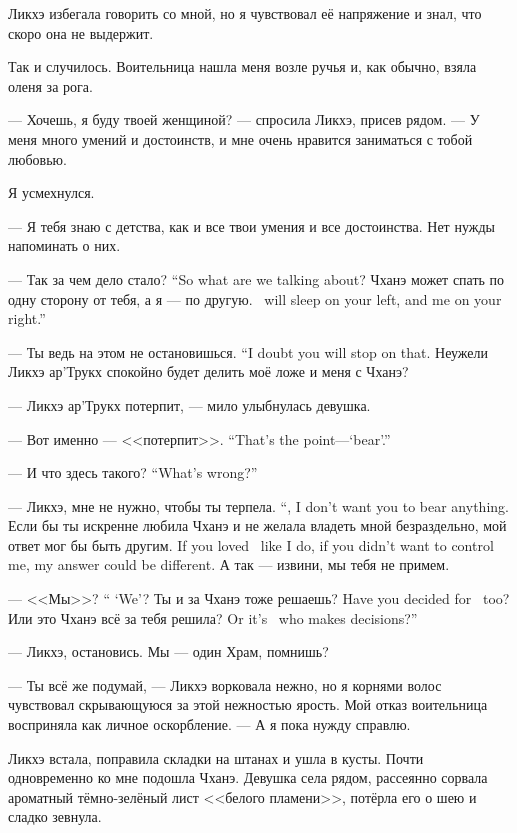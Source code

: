 Ликхэ избегала говорить со мной, но я чувствовал её напряжение и знал, что скоро она не выдержит.

Так и случилось.
Воительница нашла меня возле ручья и, как обычно, взяла оленя за рога.

--- Хочешь, я буду твоей женщиной? --- спросила Ликхэ, присев рядом.
--- У меня много умений и достоинств, и мне очень нравится заниматься с тобой любовью.

Я усмехнулся.

--- Я тебя знаю с детства, как и все твои умения и все достоинства.
Нет нужды напоминать о них.

{--- Так за чем дело стало?}
{``So what are we talking about?}
{Чханэ может спать по одну сторону от тебя, а я --- по другую.}
{\Chhanei\ will sleep on your left, and me on your right.''}

{--- Ты ведь на этом не остановишься.}
{``I doubt you will stop on that.}
Неужели Ликхэ ар'Трукх спокойно будет делить моё ложе и меня с Чханэ?

--- Ликхэ ар'Трукх потерпит, --- мило улыбнулась девушка.

{--- Вот именно --- <<потерпит>>.}
{``That's the point---`bear'.''}

{--- И что здесь такого?}
{``What's wrong?''}

{--- Ликхэ, мне не нужно, чтобы ты терпела.}
{``\Likchoe, I don't want you to bear anything.}
{Если бы ты искренне любила Чханэ и не желала владеть мной безраздельно, мой ответ мог бы быть другим.}
{If you loved \Chhanei\ like I do, if you didn't want to control me, my answer could be different.}
А так --- извини, мы тебя не примем.

{--- <<Мы>>?}
{`` `We'?}
{Ты и за Чханэ тоже решаешь?}
{Have you decided for \Chhanei\ too?}
{Или это Чханэ всё за тебя решила?}
{Or it's \Chhanei\ who makes decisions?''}

--- Ликхэ, остановись.
Мы --- один Храм, помнишь?

--- Ты всё же подумай, --- Ликхэ ворковала нежно, но я корнями волос чувствовал скрывающуюся за этой нежностью ярость.
Мой отказ воительница восприняла как личное оскорбление.
--- А я пока нужду справлю.

Ликхэ встала, поправила складки на штанах и ушла в кусты.
Почти одновременно ко мне подошла Чханэ.
Девушка села рядом, рассеянно сорвала ароматный тёмно-зелёный лист <<белого пламени>>, потёрла его о шею и сладко зевнула.

